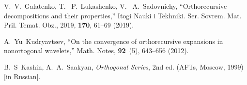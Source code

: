 \documentclass[
11pt,%
tightenlines,%
twoside,%
onecolumn,%
nofloats,%
nobibnotes,%
nofootinbib,%
superscriptaddress,%
noshowpacs,%
centertags]%
{revtex4}
\begin{document}
\begin{thebibliography}{99}
V.~V.~Galatenko, T.~ P.~Lukashenko, V.~ A.~Sadovnichy,
``Orthorecursive   decompositions and their properties,'' Itogi
Nauki i Tekhniki. Ser. Sovrem. Mat. Pril. Temat. Obz., 2019,
\textbf{170},  61--69 (2019).

A.~Yu~Kudryavtsev, ``On the convergence of orthorecursive
expansions in nonortogonal wavelets,''  Math. Notes,
\textbf{92}~(5), 643--656 (2012).

B.~S~Kashin, A.~A.~Saakyan, \textit{ Orthogonal Series}, 2nd ed.
(AFTs, Moscow, 1999) [in Russian].

\end{thebibliography}
\end{document}
